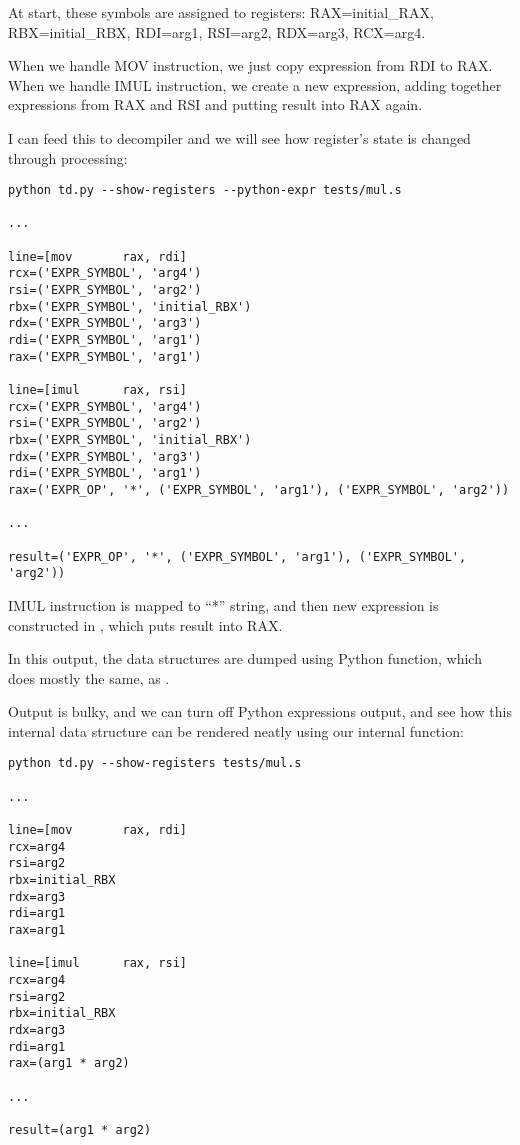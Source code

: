 At start, these symbols are assigned to registers:
RAX=initial\_RAX,
RBX=initial\_RBX,
RDI=arg1,
RSI=arg2,
RDX=arg3,
RCX=arg4.

When we handle MOV instruction, we just copy expression from RDI to RAX.
When we handle IMUL instruction, we create a new expression, adding together expressions from RAX and RSI and putting
result into RAX again.

I can feed this to decompiler and we will see how register's state is changed through processing:

\begin{lstlisting}
python td.py --show-registers --python-expr tests/mul.s

...

line=[mov       rax, rdi]
rcx=('EXPR_SYMBOL', 'arg4')
rsi=('EXPR_SYMBOL', 'arg2')
rbx=('EXPR_SYMBOL', 'initial_RBX')
rdx=('EXPR_SYMBOL', 'arg3')
rdi=('EXPR_SYMBOL', 'arg1')
rax=('EXPR_SYMBOL', 'arg1')

line=[imul      rax, rsi]
rcx=('EXPR_SYMBOL', 'arg4')
rsi=('EXPR_SYMBOL', 'arg2')
rbx=('EXPR_SYMBOL', 'initial_RBX')
rdx=('EXPR_SYMBOL', 'arg3')
rdi=('EXPR_SYMBOL', 'arg1')
rax=('EXPR_OP', '*', ('EXPR_SYMBOL', 'arg1'), ('EXPR_SYMBOL', 'arg2'))

...

result=('EXPR_OP', '*', ('EXPR_SYMBOL', 'arg1'), ('EXPR_SYMBOL', 'arg2'))
\end{lstlisting}

IMUL instruction is mapped to ``*'' string, and then new expression is constructed in 
, which puts result into RAX.

In this output, the data structures are dumped using Python  function, which does mostly the same, as .

Output is bulky, and we can turn off Python expressions output, and see how this internal data structure can be rendered neatly
using our internal  function:

\begin{lstlisting}
python td.py --show-registers tests/mul.s

...

line=[mov       rax, rdi]
rcx=arg4
rsi=arg2
rbx=initial_RBX
rdx=arg3
rdi=arg1
rax=arg1

line=[imul      rax, rsi]
rcx=arg4
rsi=arg2
rbx=initial_RBX
rdx=arg3
rdi=arg1
rax=(arg1 * arg2)

...

result=(arg1 * arg2)
\end{lstlisting}

